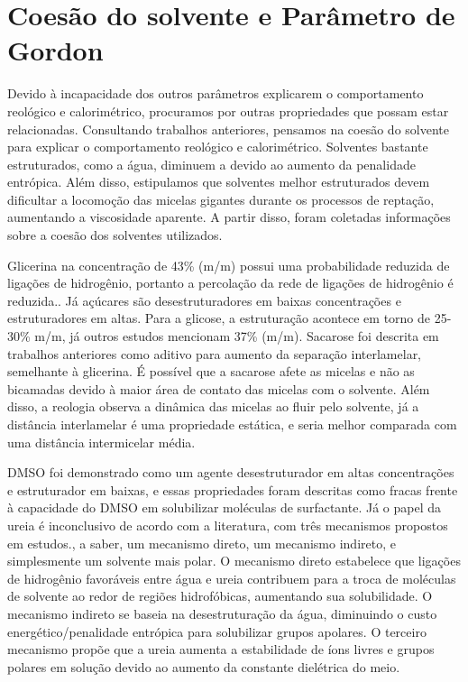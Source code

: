 		
		\FloatBarrier
		\section{Coesão do solvente e Parâmetro de Gordon}  
		
		Devido à incapacidade dos outros parâmetros explicarem o comportamento reológico e calorimétrico, procuramos por outras propriedades que possam estar relacionadas. Consultando trabalhos anteriores, pensamos na coesão do solvente para explicar o comportamento reológico e calorimétrico. Solventes bastante estruturados, como a água, diminuem a \cmc{} devido ao aumento da penalidade entrópica. Além disso, estipulamos que solventes melhor estruturados devem dificultar a locomoção das micelas gigantes durante os processos de reptação, aumentando a viscosidade aparente. A partir disso, foram coletadas informações sobre a coesão dos solventes utilizados.
		
		Glicerina na concentração de 43\% (m/m) possui uma probabilidade reduzida de ligações de hidrogênio, portanto a percolação da rede de ligações de hidrogênio é reduzida.\cite{Parsons2001a, Dashnau2006}. Já açúcares são desestruturadores em baixas concentrações e estruturadores em altas. Para a glicose, a estruturação acontece em torno de 25-30\% m/m,\cite{Giangiacomo2006} já outros estudos mencionam 37\% (m/m).\cite{Ueberreiter1982} Sacarose foi descrita em trabalhos anteriores\cite{Song2008a} como aditivo para aumento da separação interlamelar, semelhante à glicerina. É possível que a sacarose afete as micelas e não as bicamadas devido à maior área de contato das micelas com o solvente. Além disso, a reologia observa a dinâmica das micelas ao fluir pelo solvente, já a distância interlamelar é uma propriedade estática, e seria melhor comparada com uma distância intermicelar média.
		
		DMSO foi demonstrado como um agente desestruturador em altas concentrações e estruturador em baixas, e essas propriedades foram descritas como fracas frente à capacidade do DMSO em solubilizar moléculas de surfactante.\cite{Bertoluzza1979b}
		Já o papel da ureia é inconclusivo de acordo com a literatura, com três mecanismos propostos em estudos.\cite{Dias2002}, a saber, um mecanismo direto, um mecanismo indireto, e simplesmente um solvente mais polar. O mecanismo direto estabelece que ligações de hidrogênio favoráveis entre água e ureia contribuem para a troca de moléculas de solvente ao redor de regiões hidrofóbicas, aumentando sua solubilidade. O mecanismo indireto se baseia na desestruturação da água, diminuindo o custo energético/penalidade entrópica para solubilizar grupos apolares. O terceiro mecanismo propõe que a ureia aumenta a estabilidade de íons livres e grupos polares em solução devido ao aumento da constante dielétrica do meio.\cite{Dias2002}
		
